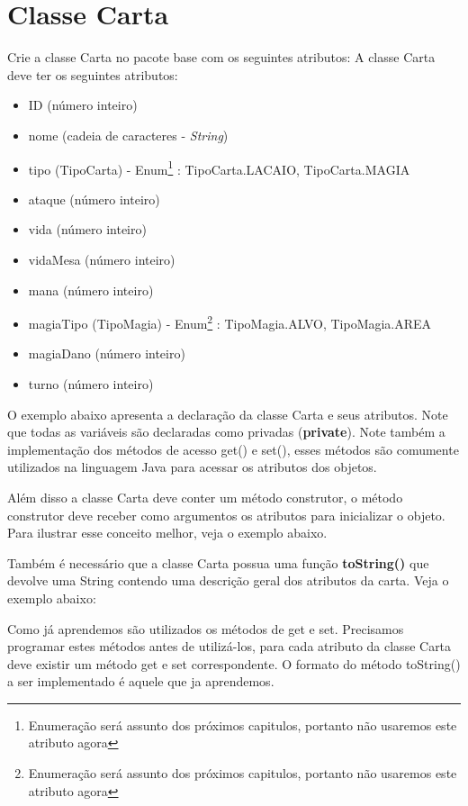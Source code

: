 \documentclass[10pt]{article}
\begin{document}
\section{Classe Carta}
Crie a classe Carta no pacote base com os seguintes atributos:
A classe Carta deve ter os seguintes atributos:
\begin{itemize}
    \item ID (número inteiro)
    \item nome (cadeia de caracteres - \emph{String})
    \item tipo (TipoCarta) - Enum\footnote{Enumeração será assunto dos próximos capitulos, portanto não usaremos este atributo agora} \textcopyright: TipoCarta.LACAIO, TipoCarta.MAGIA
    \item ataque (número inteiro)
    \item vida (número inteiro)
    \item vidaMesa (número inteiro)
    \item mana (número inteiro)
    \item magiaTipo (TipoMagia) - Enum\footnote{Enumeração será assunto dos próximos capitulos, portanto não usaremos este atributo agora} \textcopyright: TipoMagia.ALVO, TipoMagia.AREA
     \item magiaDano (número inteiro)
    \item turno (número inteiro)
\end{itemize}

O exemplo abaixo apresenta a declaração da classe Carta e seus atributos. Note que todas as variáveis são declaradas como privadas (\textbf{private}). Note também a implementação dos métodos de acesso get() e set(), esses métodos são comumente utilizados na linguagem Java para acessar os atributos dos objetos.



Além disso a classe Carta deve conter um método construtor, o método construtor deve receber como argumentos os atributos para inicializar o objeto. Para ilustrar esse conceito melhor, veja o exemplo abaixo.



Também é necessário que a classe Carta possua uma função \textbf{toString()} que devolve uma String contendo uma descrição geral dos atributos da carta. Veja o exemplo abaixo:



Como já aprendemos são utilizados os métodos de get e set. Precisamos programar estes métodos antes de utilizá-los,  para cada atributo da classe Carta deve existir um método get e set correspondente. O formato do método toString() a ser implementado é aquele que ja aprendemos.
\end{document}
